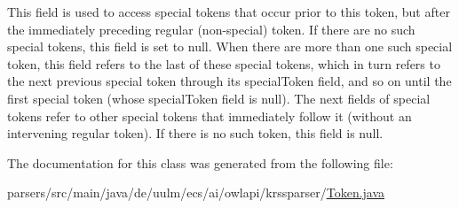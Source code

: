 This field is used to access special tokens that occur prior to this token, but after the immediately preceding regular (non-\/special) token. If there are no such special tokens, this field is set to null. When there are more than one such special token, this field refers to the last of these special tokens, which in turn refers to the next previous special token through its special\-Token field, and so on until the first special token (whose special\-Token field is null). The next fields of special tokens refer to other special tokens that immediately follow it (without an intervening regular token). If there is no such token, this field is null. 

The documentation for this class was generated from the following file\-:\begin{DoxyCompactItemize}
\item 
parsers/src/main/java/de/uulm/ecs/ai/owlapi/krssparser/\hyperlink{de_2uulm_2ecs_2ai_2owlapi_2krssparser_2_token_8java}{Token.\-java}\end{DoxyCompactItemize}
